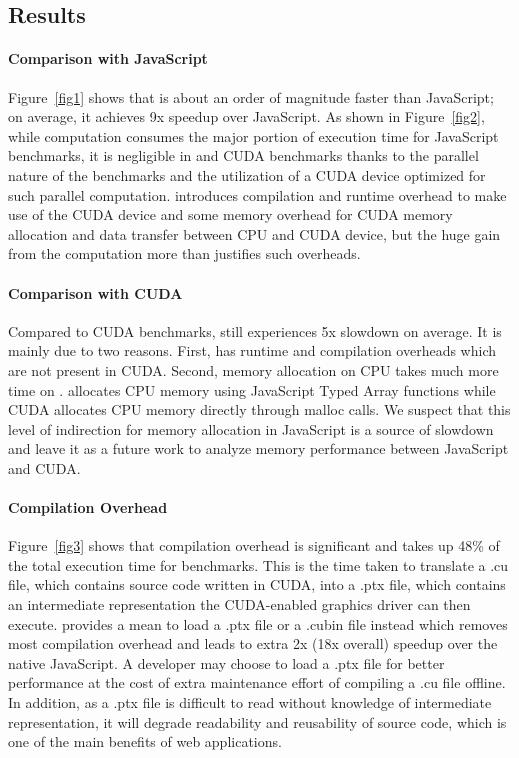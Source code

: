 
\subsection{Results}

\paragraph{Comparison with JavaScript} Figure~\ref{fig1} shows that \name is
about an order of magnitude faster than JavaScript; on average, it achieves 9x
speedup over JavaScript. As shown in Figure~\ref{fig2}, while computation
consumes the major portion of execution time for JavaScript benchmarks, it is
negligible in \name and CUDA benchmarks thanks to the parallel
nature of the benchmarks and the utilization of a CUDA device optimized for such
parallel computation. \name introduces compilation and runtime overhead to make
use of the CUDA device and some memory overhead for CUDA memory allocation and data
transfer between CPU and CUDA device, but the huge gain from the computation
more than justifies such overheads.

\paragraph{Comparison with CUDA} Compared to CUDA benchmarks, \name
still experiences 5x slowdown on average. It is mainly due to two reasons.
First, \name has runtime and compilation overheads which are not present in CUDA.
Second, memory allocation on CPU takes much more time on \namens. \name
allocates CPU memory using JavaScript Typed Array functions while CUDA
allocates CPU memory directly through malloc calls. We suspect that this level of
indirection for memory allocation in JavaScript is a source of slowdown
and leave it as a future work to analyze memory performance between JavaScript
and CUDA.

\paragraph{Compilation Overhead} Figure~\ref{fig3} shows that compilation
overhead is significant and takes up 48\% of the total execution time for \name
benchmarks. This is the time taken to translate a .cu file, which contains source code
written in CUDA, into a .ptx file, which contains an intermediate
representation the CUDA-enabled graphics driver can then execute. \name provides a mean to
load a .ptx file or a .cubin file instead which removes most
compilation overhead and leads to extra 2x (18x overall) speedup over the native JavaScript. A
developer may choose to load a .ptx file for better performance at the cost of
extra maintenance effort of compiling a .cu file offline. In addition, as a .ptx
file is difficult to read without knowledge of intermediate representation, it
will degrade readability and reusability of source code, which is one of the main
benefits of web applications.

